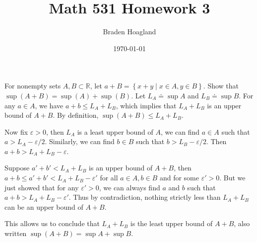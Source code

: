 \documentclass[10pt]{amsart}
\theoremstyle{plain}
\newenvironment{exercise}[1]{%
  \renewcommand\themanualtheoreminner{#1}%
  \manualtheoreminner
}{\endmanualtheoreminner}
\theoremstyle{definition}
\newcommand{\<}{\langle}
\renewcommand{\>}{\rangle}
\begin{document}
%

\title{Math 531 Homework 3}
\author{Braden Hoagland}


\date{\today}

\maketitle



\begin{exercise}{1.7}
	For nonempty sets $A,B \subset \mathbb{R}$, let $a+B=\left\{ x+y \;|\; x\in A, y\in B \right\}$. Show that $\sup(A+B) = \sup(A) + \sup(B)$.
\end{exercise}
Let $L_A \doteq \sup A$ and $L_B \doteq \sup B$. For any $a \in A$, we have $a+b \leq L_A + L_B$, which implies that $L_A + L_B$ is an upper bound of $A+B$. By definition, $\sup(A+B) \leq L_A + L_B$.

Now fix $\varepsilon > 0$, then $L_A$ is a least upper bound of $A$, we can find $a \in A$ such that $a > L_A - \varepsilon/2$. Similarly, we can find $b \in B$ such that $b>L_B - \varepsilon/2$. Then $a + b > L_A + L_B - \varepsilon$.

Suppose $a'+b' < L_A + L_B$ is an upper bound of $A+B$, then $a+b \leq a'+b' < L_A + L_B - \varepsilon'$ for all $a\in A, b\in B$ and for some $\varepsilon' > 0$. But we just showed that for any $\varepsilon' > 0$, we can always find $a$ and $b$ such that $a+b > L_A + L_B - \varepsilon'$. Thus by contradiction, nothing strictly less than $L_A + L_B$ can be an upper bound of $A+B$.

This allows us to conclude that $L_A + L_B$ is the least upper bound of $A+B$, also written $\sup(A+B) = \sup A + \sup B$.
\end{document}
